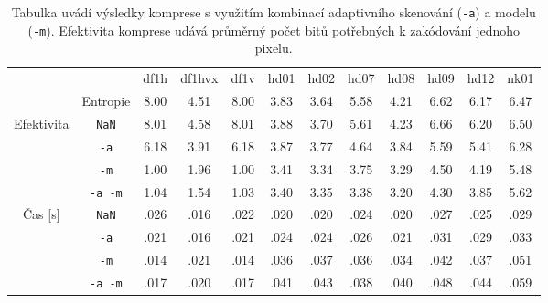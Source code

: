 \documentclass[a4paper, 11pt, fleqn]{scrartcl}
\begin{document}
      \begin{table}[!h]
        \centering
        \captionsetup{justification=justified}
        \begin{tabular}{|c|c||c|c|c|c|c|c|c|c|c|c|}
          \cline{3-12}
          \multicolumn{2}{c||}{}                                 & df1h & df1hvx & df1v & hd01 & hd02 & hd07 & hd08 & hd09 & hd12 & nk01\\[0.5ex]
          \cline{2-12}\morecmidrules\cmidrule{2-12}
          \multicolumn{1}{c|}{}       & Entropie                & 8.00 &  4.51  & 8.00 & 3.83 & 3.64 & 5.58 & 4.21 & 6.62 & 6.17 & 6.47\\[0.5ex]
          \hline
          \multirow{4}{*}{Efektivita} &  \texttt{NaN}  & 8.01 &  4.58  & 8.01 & 3.88 & 3.70 & 5.61 & 4.23 & 6.66 & 6.20 & 6.50\\[0.5ex]
                                      & \texttt{-a}    & 6.18 &  3.91  & 6.18 & 3.87 & 3.77 & 4.64 & 3.84 & 5.59 & 5.41 & 6.28\\[0.5ex]
                                      & \texttt{-m}    & 1.00 &  1.96  & 1.00 & 3.41 & 3.34 & 3.75 & 3.29 & 4.50 & 4.19 & 5.48\\[0.5ex]
                                      & \texttt{-a -m} & 1.04 &  1.54  & 1.03 & 3.40 & 3.35 & 3.38 & 3.20 & 4.30 & 3.85 & 5.62\\[0.5ex]
          \hline
          \multirow{4}{*}{Čas [s]}    & \texttt{NaN}   & .026 &  .016  & .022 & .020 & .020 & .024 & .020 & .027 & .025 & .029\\[0.5ex]
                                      & \texttt{-a}    & .021 &  .016  & .021 & .024 & .024 & .026 & .021 & .031 & .029 & .033\\[0.5ex]
                                      & \texttt{-m}    & .014 &  .021  & .014 & .036 & .037 & .036 & .034 & .042 & .037 & .051\\[0.5ex]
                                      & \texttt{-a -m} & .017 &  .020  & .017 & .041 & .043 & .038 & .040 & .048 & .044 & .059\\[0.5ex]
          \hline

        \end{tabular}
        \caption{Tabulka uvádí výsledky komprese s využitím kombinací adaptivního skenování (\texttt{-a}) a modelu (\texttt{-m}). Efektivita komprese udává průměrný počet bitů potřebných k zakódování jednoho pixelu.}
      \end{table}
\end{document}
